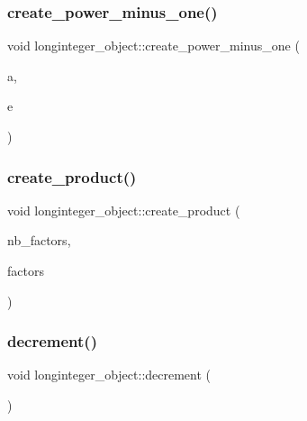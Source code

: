 \subsubsection{\texorpdfstring{create\+\_\+power\+\_\+minus\+\_\+one()}{create\_power\_minus\_one()}}
{\footnotesize\ttfamily void longinteger\+\_\+object\+::create\+\_\+power\+\_\+minus\+\_\+one (\begin{DoxyParamCaption}\item[{\mbox{\hyperlink{galois_8h_a09fddde158a3a20bd2dcadb609de11dc}{I\+NT}}}]{a,  }\item[{\mbox{\hyperlink{galois_8h_a09fddde158a3a20bd2dcadb609de11dc}{I\+NT}}}]{e }\end{DoxyParamCaption})}

\mbox{\label{classlonginteger__object_ab12fbea622c1d89bc753e34b89797da3}} 
\subsubsection{\texorpdfstring{create\+\_\+product()}{create\_product()}}
{\footnotesize\ttfamily void longinteger\+\_\+object\+::create\+\_\+product (\begin{DoxyParamCaption}\item[{\mbox{\hyperlink{galois_8h_a09fddde158a3a20bd2dcadb609de11dc}{I\+NT}}}]{nb\+\_\+factors,  }\item[{\mbox{\hyperlink{galois_8h_a09fddde158a3a20bd2dcadb609de11dc}{I\+NT}} $\ast$}]{factors }\end{DoxyParamCaption})}

\mbox{\label{classlonginteger__object_a9c0e2494b9282e4263df3e130ab8f594}} 
\subsubsection{\texorpdfstring{decrement()}{decrement()}}
{\footnotesize\ttfamily void longinteger\+\_\+object\+::decrement (\begin{DoxyParamCaption}{ }\end{DoxyParamCaption})}

